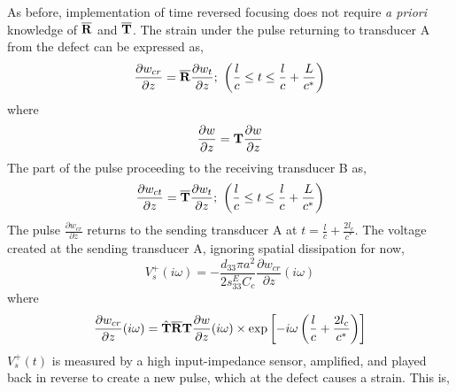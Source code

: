 \documentclass[11pt,letterpaper]{article}%
\begin{document}
As before, implementation of time reversed focusing does not
require {\em a priori} knowledge of $\overline{\bf R}$ and
$\overline{\bf T}$. The strain under the pulse returning to
transducer A from the defect can be expressed as,
\begin{equation}
\frac{\partial w_{cr}}{\partial z} = \overline{\bf R}\frac{\partial
w_t}{\partial z}; \ \left(\frac{l}{c} \leq t \leq
\frac{l}{c}+\frac{L}{c^\ast}\right) \label{defrefl1}
\end{equation}
where
\begin{equation}
\frac{\partial w}{\partial z} = {\bf T}\frac{\partial w}{\partial
z}\nonumber
\end{equation}
The part of the pulse proceeding to the receiving transducer B as,
\begin{equation}
\frac{\partial w_{ct}}{\partial z} = \overline{\bf T}\frac{\partial
w_t}{\partial z}; \ \left(\frac{l}{c} \leq t \leq
\frac{l}{c}+\frac{L}{c^\ast}\right) \label{deftrans1}
\end{equation}
%
The pulse $\frac{\partial w_{cr}}{\partial z}$ returns to the
sending transducer A at $t = \frac{l}{c}+\frac{2l_c}{c^\ast}$. The
voltage created at the sending transducer A, ignoring spatial
dissipation for now,
\begin{equation}
V^{+}_s(i\omega) = -\frac{d_{33}\pi
a^2}{2s^E_{33}C_c}\frac{\partial w_{cr}}{\partial z}(i\omega)
\label{vsenddefect}
\end{equation}
 where
\begin{equation}
\frac{\partial w_{cr}}{\partial z}(i\omega) = {\hat{\bf
T}}\overline{\bf R}{\bf T}\frac{{\partial w}}{\partial
z}(i\omega)\times{\exp
}\left[{-i\omega\left(\frac{l}{c}+\frac{2l_c}{c^\ast}\right)}\right]
\label{strnsenddefect}
\end{equation}
$V^{+}_s(t)$ is measured by a high input-impedance sensor,
amplified, and played back in reverse to create a new pulse, which
at the defect causes a strain.  This is,
\end{document}
